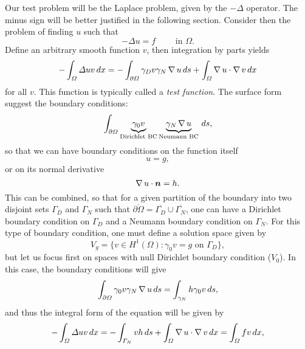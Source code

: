 Our test problem will be the Laplace problem, given by the $-\Delta$ operator. The minus sign will be better justified in the following section. Consider then the problem of finding $u$ such that 
\begin{equation}
    -\Delta u = f \qquad \text{ in $\Omega$}.
\end{equation}
Define an arbitrary smooth function $v$, then integration by parts yields
\begin{equation}\label{eq:ibp-poisson}
    - \int_\Omega \Delta u v\,dx = -\int_{\partial\Omega}\gamma_D v \gamma_N \operatorname{\nabla} u \,ds + \int_\Omega \operatorname{\nabla} u \cdot \operatorname{\nabla} v\,dx
\end{equation}
for all $v$. This function is typically called a \emph{test function}. The surface form suggest the boundary conditions: 
\begin{equation}
    \int_{\partial\Omega}\underbrace{\gamma_0 v}_\text{Dirichlet BC} \underbrace{\gamma_N \operatorname{\nabla} u}_\text{Neumann BC} \,ds,
\end{equation}
so that we can have boundary conditions on the function itself  
\begin{equation*}
    u = g,
\end{equation*}
or on its normal derivative
\begin{equation*}
    \grad u \cdot \vec n = h.
\end{equation*}
This can be combined, so that for a given partition of the boundary into two disjoint sets $\Gamma_D$ and $\Gamma_N$ such that $\overline{\partial\Omega} = \overline{\Gamma_D}\cup\overline{\Gamma_N}$, one can have a Dirichlet boundary condition on $\Gamma_D$ and a Neumann boundary condition on $\Gamma_N$. For this type of boundary condition, one must define a solution space given by 
\begin{equation}
    V_g = \{v \in H^1(\Omega): \gamma_0 v = g \text{ on $\Gamma_D$}\},
\end{equation}
but let us focus first on spaces with null Dirichlet boundary condition ($V_0$). In this case, the boundary conditions will give
\begin{equation*}
    \int_{\partial\Omega}\gamma_0 v \gamma_N \operatorname{\nabla} u\,ds = \int_{\gamma_N} h \gamma_0 v\,ds,
\end{equation*}
and thus the integral form of the equation will be given by
\begin{equation*}
    -\int_\Omega\Delta u v\,dx = -\int_{\Gamma_N}v h\,ds + \int_\Omega \operatorname{\nabla} u \cdot \operatorname{\nabla} v\,dx = \int_\Omega f v\,dx,
\end{equation*}
